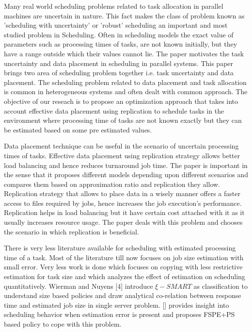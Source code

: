 \documentclass[10pt, conference, compsocconf]{IEEEtran}
\begin{document}
Many real world scheduling problems related to task allocation in parallel machines are uncertain in nature. This fact makes the class of problem  known as 'scheduling with uncertainty' or 'robust' scheduling an important and most studied problem in Scheduling.  Often in  scheduling models the exact value of parameters such as processing times of tasks, are not known initially,   but they have a range outside which their values cannot  lie.  The paper motivates the task uncertainty and data placement in scheduling in parallel systems. This paper brings two area of scheduling problem together i.e. task uncertainty and data placement.  The scheduling problem related to data placement and task allocation is common in heterogeneous systems and often dealt with common approach.  The objective of our reseach  is to propose an optimization approach that takes into account  effective data placement using replication to schedule  tasks in the environment where processing time of tasks are not known exactly but they can be estimated based on some pre estimated values.

Data placement technique can be useful in the scenario of uncertain processing times of tasks. Effective data placement using replication strategy allows better load balancing and hence reduces turnaround job time.   The paper is important in the sense that it proposes different models depending upon different scenarios and compares them based on approximation ratio and replication they allow.  Replication strategy that allows to place data in a wisely manner  offers a faster access to files required by  jobs, hence increases the job execution’s performance. Replication helps in load balancing but it have certain cost attached with it as it usually increases resource usage\cite{IEEEhowto:wang}.  The paper deals with this problem and chooses the scenario in which replication is beneficial. 


There is very less literature available for scheduling with estimated processing time of a task.  Most of the literature till now focuses on job size estimation with small error.  Very less work is done which focuses on copying with less restrictive estimation for task size and which analyzes the effect of estimation on scheduling quantitatively.   Wierman and Nuyens [4] introduce $ \xi-SMART$ as classification to understand size based policies and draw analytical co-relation between response time and estimated job size in single server problem. [] provides insight into scheduling behavior when estimation error is present and proposes FSPE+PS based policy to cope with this problem.
 
\end{document}
